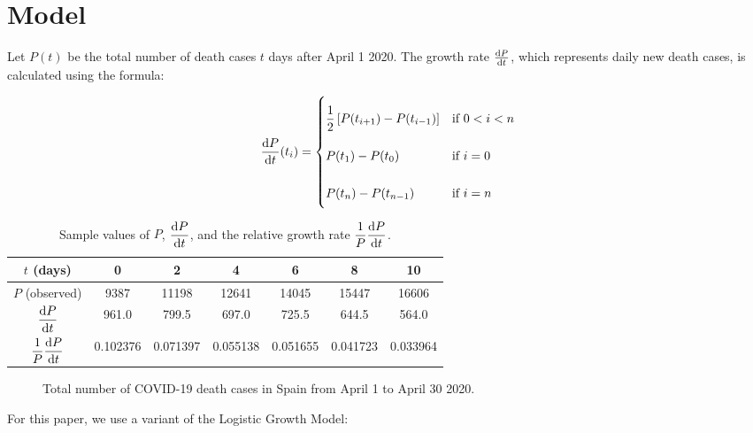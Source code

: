 \documentclass[12pt]{scrartcl}
\begin{document}
\section*{Model}

Let $P(t)$ be the total number of death cases $t$ days after April 1 2020.
The growth rate $\diff{P}{t}$, which represents daily new death cases,
is calculated using the formula:

\begin{align} \label{rate_formula}
\diff{P}{t}(t_i) =
\renewcommand{\arraystretch}{2.5}\left\{\begin{array}{@{}l@{\quad}l@{}}
  \dfrac{1}{2} \left [ P(t_{i + 1}) - P(t_{i - 1}) \right ] &\text{if } 0 < i < n \\
  P(t_{1}) - P(t_{0}) &\text{if } i = 0 \\
  P(t_{n}) - P(t_{n - 1}) &\text{if } i = n \\
\end{array}\right.\kern-\nulldelimiterspace
\end{align}


\begin{table}[h!]
\centering
\tabulinesep=1.2mm
\begin{tabu}{ |c|c|c|c|c|c|c| }
  \hline
  $t$ (days) & 0 & 2 & 4 & 6 & 8 & 10\\
  \hline
  $P$ (observed) & 9387 & 11198 & 12641 & 14045 & 15447 & 16606 \\
  \hline
  $\displaystyle\diff{P}{t}$ & 961.0 & 799.5 & 697.0 & 725.5 & 644.5 & 564.0 \\
  \hline
  $\dfrac{1}{P} \displaystyle\diff{P}{t}$ & 0.102376 & 0.071397 & 0.055138 & 0.051655 & 0.041723 & 0.033964 \\
  \hline
\end{tabu}
\caption{Sample values of $P$, $\displaystyle\diff{P}{t}$, and the relative growth rate $\dfrac{1}{P} \displaystyle\diff{P}{t}$.}
\label{table:2}
\end{table}

\begin{figure}[H]
  \centering
  
  \caption{Total number of COVID-19 death cases in Spain from April 1 to April 30 2020.}
\end{figure}

For this paper, we use a variant of the Logistic Growth Model:
\end{document}
